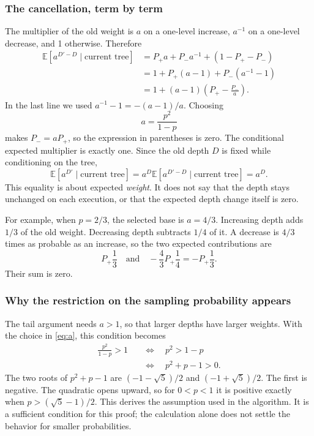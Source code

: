 \documentclass[11pt,a4paper]{article}
\theoremstyle{readable}
\newcommand{\E}{\mathbb E}
\begin{document}
\subsubsection*{The cancellation, term by term}
The multiplier of the old weight is $a$ on a one-level increase,
$a^{-1}$ on a one-level decrease, and 1 otherwise. Therefore
\begin{align*}
  \E[a^{D'-D}\mid\text{current tree}]
   &=P_+a+P_-a^{-1}+(1-P_+-P_-)\\
   &=1+P_+(a-1)+P_-(a^{-1}-1)\\
   &=1+(a-1)\left(P_+-\frac{P_-}{a}\right).
\end{align*}
In the last line we used $a^{-1}-1=-(a-1)/a$. Choosing
\begin{equation}
  a=\frac{p^2}{1-p}
  \label{eq:a}
\end{equation}
makes $P_-=aP_+$, so the expression in parentheses is zero. The
conditional expected multiplier is exactly one. Since the old depth
$D$ is fixed while conditioning on the tree,
\[
  \E[a^{D'}\mid\text{current tree}]
     =a^D\E[a^{D'-D}\mid\text{current tree}]=a^D.
\]
This equality is about expected \emph{weight}. It does not say that
the depth stays unchanged on each execution, or that the expected
depth change itself is zero.

For example, when $p=2/3$, the selected base is $a=4/3$.
Increasing depth adds $1/3$ of the old weight. Decreasing depth
subtracts $1/4$ of it. A decrease is $4/3$ times as probable as an
increase, so the two expected contributions are
\[
  P_+\frac13
   \quad\text{and}\quad
  -\frac43P_+\frac14=-P_+\frac13.
\]
Their sum is zero.

\subsubsection*{Why the restriction on the sampling probability appears}
The tail argument needs $a>1$, so that larger depths have larger
weights. With the choice in \eqref{eq:a}, this condition becomes
\begin{align*}
  \frac{p^2}{1-p}>1
  &\quad\Longleftrightarrow\quad p^2>1-p\\
  &\quad\Longleftrightarrow\quad p^2+p-1>0.
\end{align*}
The two roots of $p^2+p-1$ are $(-1-\sqrt5)/2$ and
$(-1+\sqrt5)/2$. The first is negative. The quadratic opens upward,
so for $0<p<1$ it is positive exactly when
$p>(\sqrt5-1)/2$. This derives the assumption used in the algorithm.
It is a sufficient condition for this proof; the calculation alone
does not settle the behavior for smaller probabilities.
\end{document}
